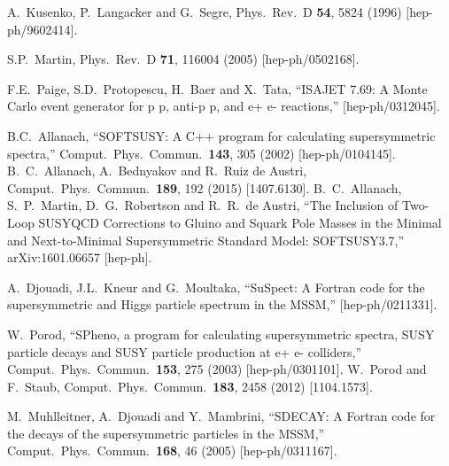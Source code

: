 \documentclass[11pt]{article}
\begin{document}
\begin{thebibliography}{999}
A.~Kusenko, P.~Langacker and G.~Segre, 
  Phys.\ Rev.\ D {\bf 54}, 5824 (1996)
  [hep-ph/9602414].

  S.P.~Martin,
  Phys.\ Rev.\  D {\bf 71}, 116004 (2005)
  [hep-ph/0502168].

F.E.~Paige, S.D.~Protopescu, H.~Baer and X.~Tata,
  ``ISAJET 7.69: A Monte Carlo event generator for p p, anti-p p, and e+ e-
  reactions,''
  [hep-ph/0312045].

B.C.~Allanach,
  ``SOFTSUSY: A C++ program for calculating supersymmetric spectra,''
  Comput.\ Phys.\ Commun.\  {\bf 143}, 305 (2002)
  [hep-ph/0104145].
  B.~C.~Allanach, A.~Bednyakov and R.~Ruiz de Austri,
  Comput.\ Phys.\ Commun.\  {\bf 189}, 192 (2015)
  [1407.6130].
B.~C.~Allanach, S.~P.~Martin, D.~G.~Robertson and R.~R.~de Austri,
  ``The Inclusion of Two-Loop SUSYQCD Corrections to Gluino and Squark Pole Masses in the Minimal and Next-to-Minimal Supersymmetric Standard Model: SOFTSUSY3.7,''
  arXiv:1601.06657 [hep-ph].
    
A.~Djouadi, J.L.~Kneur and G.~Moultaka,
  ``SuSpect: A Fortran code for the supersymmetric and Higgs particle spectrum
  in the MSSM,''
  [hep-ph/0211331].

W.~Porod,
  ``SPheno, a program for calculating supersymmetric spectra, SUSY particle
  decays and SUSY particle production at e+ e- colliders,''
  Comput.\ Phys.\ Commun.\  {\bf 153}, 275 (2003)
  [hep-ph/0301101].
W.~Porod and F.~Staub,
  Comput.\ Phys.\ Commun.\  {\bf 183}, 2458 (2012)
  [1104.1573].
  
M.~Muhlleitner, A.~Djouadi and Y.~Mambrini,
  ``SDECAY: A Fortran code for the decays of the supersymmetric particles in
  the MSSM,''
  Comput.\ Phys.\ Commun.\  {\bf 168}, 46 (2005)
  [hep-ph/0311167].


\end{thebibliography}
\end{document}
